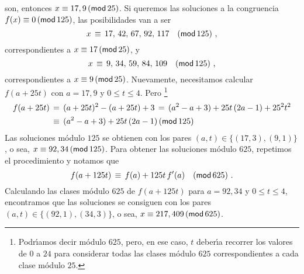 \begin{ejemHensel}
	son, entonces $x\equiv 17,9\tmodulo[25]$.
	Si queremos las soluciones a la congruencia
	$f(x)\equiv 0\tmodulo[125]$, las posibilidades van a ser
	\begin{displaymath}
		x\,\equiv\,17,\,42,\,67,\,92,\,117\modulo[125]
		\dispcomma
	\end{displaymath}
	correspondientes a $x\equiv 17\tmodulo[25]$, y
	\begin{displaymath}
		x\,\equiv\,9,\,34,\,59,\,84,\,109\modulo[125]
		\dispcomma
	\end{displaymath}
	correspondientes a $x\equiv 9\tmodulo[25]$.
	Nuevamente, necesitamos calcular $f(a+25t)$ con
	$a=17,9$ y $0\leq t\leq 4$. Pero%
	\footnote{
		Podr\'{\i}amos decir m\'odulo $625$,
		pero, en ese caso, $t$ deber\'{\i}a recorrer
		los valores de $0$ a $24$ para considerar
		todas las clases m\'odulo $625$
		correspondientes a cada clase m\'odulo $25$.
	}
	\begin{displaymath}
		\begin{aligned}
			f(a+25t) & \,=\,(a+25t)^2-(a+25t)+3\,=\,
				(a^2-a+3)+25t\,(2a-1)+25^2t^2 \\
			& \,\equiv\, (a^2-a+3)+25t\,(2a-1)\tmodulo[125]
		\end{aligned}
	\end{displaymath}
	Las soluciones m\'odulo $125$ se obtienen con los pares
	$(a,t)\in\{(17,3),(9,1)\}$, o sea,
	$x\equiv 92,34\tmodulo[125]$.
	Para obtener las soluciones m\'odulo $625$, repetimos el
	procedimiento y notamos que
	\begin{displaymath}
		f(a+125t)\,\equiv\,f(a)+125t\,f'(a)\modulo[625]
		\dispstop
	\end{displaymath}
	Calculando las clases m\'odulo $625$ de $f(a+125t)$
	para $a=92,34$ y $0\leq t\leq 4$, encontramos que las
	soluciones se consiguen con los pares
	$(a,t)\in\{(92,1),(34,3)\}$, o sea,
	$x\equiv 217,409\tmodulo[625]$.
\end{ejemHensel}

